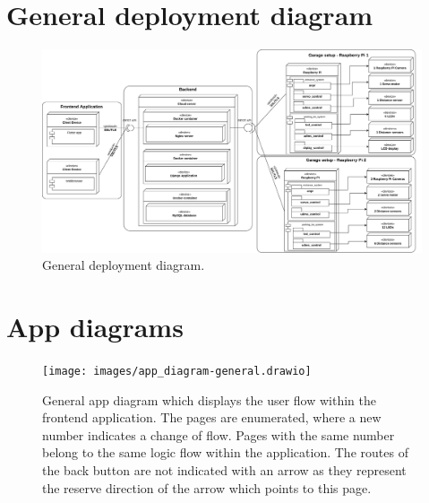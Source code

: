 \begin{appendices}
\makeatletter
{}
\makeatother


\section{General deployment diagram}\label{app:deployment-diagram}
\begin{landscape}
   \begin{figure}
    \centering
    \includegraphics[width=25cm]{images/deployment_diagram.drawio.png}
    \caption{General deployment diagram.}
    \label{fig:general-deployment-diagram}
\end{figure}
\end{landscape}

\clearpage
    
\section{App diagrams}\label{app:app-diagram}
\begin{landscape}
   \begin{figure}
    \centering
    \texttt{[image: images/app\_diagram-general.drawio]}
    \caption[General app diagram.]{General app diagram which displays the user flow within the frontend application. The pages are enumerated, where a new number indicates a change of flow. Pages with the same number belong to the same logic flow within the application. The routes of the back button are not indicated with an arrow as they represent the reserve direction of the arrow which points to this page.}
    \label{fig:general-app-diagram}
\end{figure}
\end{landscape}


\end{appendices}
